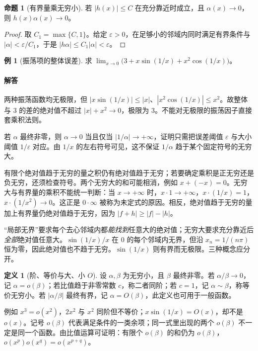 \documentclass[UTF8,fontset=fandol,12pt,oneside,openany]{ctexrep}
\theoremstyle{definition}
\newtheorem{definition}[theorem]{定义}
\newtheorem{proposition}[theorem]{命题}
\newtheorem{example}{例}[chapter]
\begin{document}
\begin{proposition}[有界量乘无穷小]
若 $|h(x)|\le C$ 在充分靠近时成立，且 $\alpha(x)\to0$，则 $h(x)\alpha(x)\to0$。
\end{proposition}
\begin{proof}
取 $C_1=\max\{C,1\}$。给定 $\varepsilon>0$，在足够小的邻域内同时满足有界条件与 $|\alpha|<\varepsilon/C_1$，于是 $|h\alpha|\le C_1|\alpha|<\varepsilon$。
\end{proof}

\begin{example}[振荡项的整体误差]
求 $\lim_{x\to0}\bigl(3+x\sin(1/x)+x^2\cos(1/x)\bigr)$。
\end{example}
\paragraph{解答}两种振荡函数均无极限，但
$|x\sin(1/x)|\le|x|$、$|x^2\cos(1/x)|\le x^2$。故整体与 $3$ 的差的绝对值不超过 $|x|+x^2\to0$，极限为 $3$。不能对无极限的振荡因子直接套乘积法则。

若 $\alpha$ 最终非零，则 $\alpha\to0$ 当且仅当 $|1/\alpha|\to+\infty$，证明只需把误差阈值 $\varepsilon$ 与大小阈值 $1/\varepsilon$ 对应。由 $1/x$ 的左右符号可见，这不保证 $1/\alpha$ 趋于某个固定符号的无穷大。

有限个绝对值趋于无穷的量之积仍有绝对值趋于无穷；若要确定乘积是正无穷还是负无穷，还须检查符号。两个无穷大的和可能相消，例如 $x+(-x)=0$。无穷大与有界量的乘积不能统一判断：当 $x\to+\infty$ 时，$x\cdot1\to+\infty$，$x\cdot(1/x)=1$，$x\cdot(1/x^2)\to0$。这正是 $0\cdot\infty$ 被称为未定式的原因。相反，绝对值趋于无穷的量加上有界量仍绝对值趋于无穷，因为 $|f+h|\ge|f|-|h|$。

“局部无界”要求每个去心邻域内都\emph{能找到}任意大的绝对值；无穷大要求充分靠近后\emph{全部}绝对值任意大。$\sin(1/x)/x$ 在 $0$ 的每个邻域内无界，但沿 $x_n=1/(n\pi)$ 恒为零，因此绝对值也不趋于无穷。$\sin(1/x)$ 则有界而无极限。三种概念应分开。

\begin{definition}[阶、等价与大、小 $O$]
设 $\alpha,\beta$ 为无穷小，且 $\beta$ 最终非零。若 $\alpha/\beta\to0$，记 $\alpha=o(\beta)$；若比值趋于非零常数 $c$，称二者同阶；若 $c=1$，记 $\alpha\sim\beta$，称等价无穷小。若 $|\alpha/\beta|$ 最终有界，记 $\alpha=O(\beta)$，此定义也可用于一般函数。
\end{definition}
例如 $x^3=o(x^2)$，$2x^2$ 与 $x^2$ 同阶但不等价；$x\sin(1/x)=O(x)$，却不是 $o(x)$。记号 $o(\beta)$ 代表满足条件的一类余项；同一式里出现的两个 $o(\beta)$ 不一定是同一个函数。由比值运算可证明：有限个 $o(\beta)$ 的和仍为 $o(\beta)$，$o(x^p)o(x^q)=o(x^{p+q})$。
\end{document}
